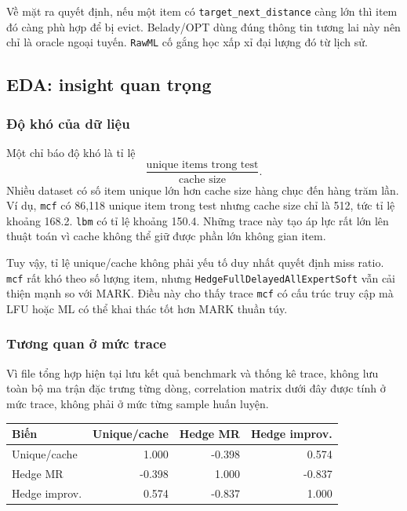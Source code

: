 \documentclass[11pt,a4paper]{article}
\newcommand{\code}[1]{\texttt{#1}}
\newcommand{\hedge}{\code{HedgeFullDelayedAllExpertSoft}}
\newcommand{\rawml}{\code{RawML}}
\begin{document}
Về mặt ra quyết định, nếu một item có \code{target\_next\_distance} càng lớn thì item đó càng phù hợp để bị evict. Belady/OPT dùng đúng thông tin tương lai này nên chỉ là oracle ngoại tuyến. \rawml{} cố gắng học xấp xỉ đại lượng đó từ lịch sử.

\subsection{EDA: insight quan trọng}

\subsubsection{Độ khó của dữ liệu}

Một chỉ báo độ khó là tỉ lệ
\[
    \frac{\text{unique items trong test}}{\text{cache size}}.
\]
Nhiều dataset có số item unique lớn hơn cache size hàng chục đến hàng trăm lần. Ví dụ, \code{mcf} có 86,118 unique item trong test nhưng cache size chỉ là 512, tức tỉ lệ khoảng 168.2. \code{lbm} có tỉ lệ khoảng 150.4. Những trace này tạo áp lực rất lớn lên thuật toán vì cache không thể giữ được phần lớn không gian item.

Tuy vậy, tỉ lệ unique/cache không phải yếu tố duy nhất quyết định miss ratio. \code{mcf} rất khó theo số lượng item, nhưng \hedge{} vẫn cải thiện mạnh so với MARK. Điều này cho thấy trace \code{mcf} có cấu trúc truy cập mà LFU hoặc ML có thể khai thác tốt hơn MARK thuần túy.

\subsubsection{Tương quan ở mức trace}

Vì file tổng hợp hiện tại lưu kết quả benchmark và thống kê trace, không lưu toàn bộ ma trận đặc trưng từng dòng, correlation matrix dưới đây được tính ở mức trace, không phải ở mức từng sample huấn luyện.

\begin{center}
\begin{tabular}{lrrr}
\toprule
Biến & Unique/cache & Hedge MR & Hedge improv. \\
\midrule
Unique/cache & 1.000 & -0.398 & 0.574 \\
Hedge MR & -0.398 & 1.000 & -0.837 \\
Hedge improv. & 0.574 & -0.837 & 1.000 \\
\bottomrule
\end{tabular}
\end{center}
\end{document}

